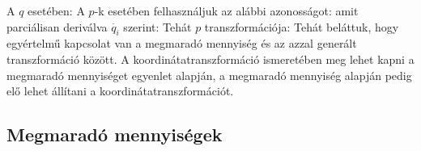    A $q$ esetében:
   A $p$-k esetében felhasználjuk az alábbi azonosságot:
   amit parciálisan deriválva $\dot{q_i}$ szerint:
   Tehát $p$ transzformációja:
   Tehát beláttuk, hogy egyértelmű kapcsolat van a megmaradó mennyiség és az azzal generált transzformáció között.
   A koordinátatranszformáció ismeretében meg lehet kapni a megmaradó mennyiséget  egyenlet alapján, a megmaradó mennyiség alapján pedig elő lehet állítani a koordinátatranszformációt. 

   \subsection{Megmaradó mennyiségek}
   
